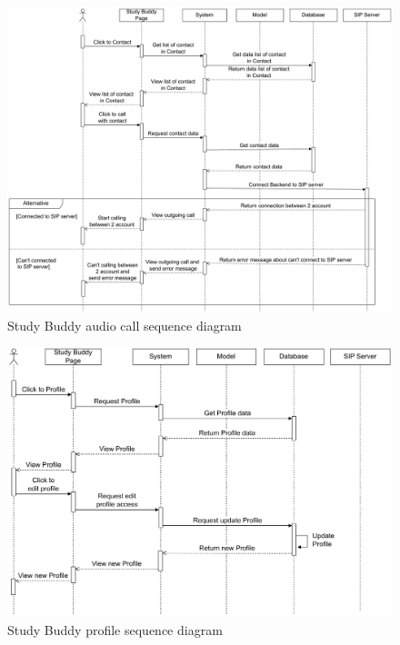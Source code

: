 \documentclass[12pt]{article}
\begin{document}
    \begin{figure}[H]
        \centering
        \includegraphics[width=1\textwidth, height=0.5\textheight]{image/StudyBuddySequenceDiagram-Contact.pdf} 
        \caption{Study Buddy audio call sequence diagram}
        \label{fig:studyBuddy_audiocall_sequence}
    \end{figure}

    \begin{figure}[H]
        \centering
        \includegraphics[width=1\textwidth]{image/StudyBuddySequenceDiagram-Profile.pdf} 
        \caption{Study Buddy profile sequence diagram}
        \label{fig:studyBuddy_profile_sequence}
    \end{figure}
\end{document}
